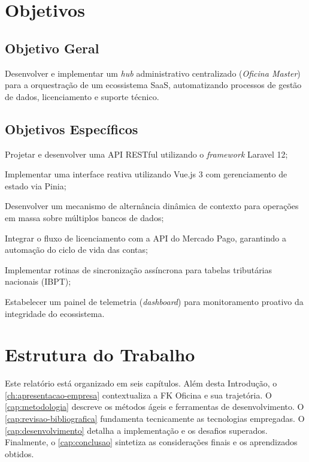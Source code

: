 \section{Objetivos}
\label{sec:objetivos}

\subsection{Objetivo Geral}
\label{subsec:objective-geral}

Desenvolver e implementar um \textit{hub} administrativo centralizado (\textit{Oficina Master}) para a orquestração de um ecossistema SaaS, automatizando processos de gestão de dados, licenciamento e suporte técnico.

\subsection{Objetivos Específicos}
\label{subsec:objetivos-especificos}

\begin{alineas}
    \item Projetar e desenvolver uma API RESTful utilizando o \textit{framework} Laravel 12;
    \item Implementar uma interface reativa utilizando Vue.js 3 com gerenciamento de estado via Pinia;
    \item Desenvolver um mecanismo de alternância dinâmica de contexto para operações em massa sobre múltiplos bancos de dados;
    \item Integrar o fluxo de licenciamento com a API do Mercado Pago, garantindo a automação do ciclo de vida das contas;
    \item Implementar rotinas de sincronização assíncrona para tabelas tributárias nacionais (IBPT);
    \item Estabelecer um painel de telemetria (\textit{dashboard}) para monitoramento proativo da integridade do ecossistema.
\end{alineas}

\section{Estrutura do Trabalho}
\label{sec:estrutura}

Este relatório está organizado em seis capítulos. Além desta Introdução, o \autoref{ch:apresentacao-empresa} contextualiza a FK Oficina e sua trajetória. O \autoref{cap:metodologia} descreve os métodos ágeis e ferramentas de desenvolvimento. O \autoref{cap:revisao-bibliografica} fundamenta tecnicamente as tecnologias empregadas. O \autoref{cap:desenvolvimento} detalha a implementação e os desafios superados. Finalmente, o \autoref{cap:conclusao} sintetiza as considerações finais e os aprendizados obtidos.
